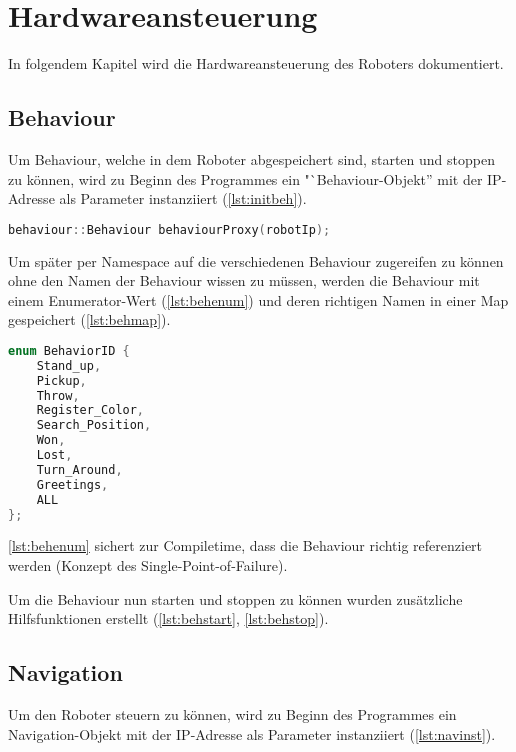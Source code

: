 \chapter{Hardwareansteuerung}

    In folgendem Kapitel wird die Hardwareansteuerung des Roboters dokumentiert.

    \section{Behaviour}

        Um Behaviour, welche in dem Roboter abgespeichert sind, starten und
        stoppen zu können, wird zu Beginn des Programmes ein
        "`Behaviour-Objekt'' mit der \ac{IP}-Adresse als Parameter instanziiert
        (\autoref{lst:initbeh}).

\begin{lstlisting}[language=c++,
                   caption={Initialisierung Behaviour},
                   label={lst:initbeh}]
behaviour::Behaviour behaviourProxy(robotIp);
\end{lstlisting}

        Um später per Namespace auf die verschiedenen Behaviour zugereifen zu
        können ohne den Namen der Behaviour wissen zu müssen, werden die
        Behaviour mit einem Enumerator-Wert (\autoref{lst:behenum}) und deren
        richtigen Namen in einer Map gespeichert (\autoref{lst:behmap}).

\begin{lstlisting}[language=c++,
                   caption={Behaviour Enumerator},
                   label={lst:behenum}]
enum BehaviorID {
    Stand_up,
    Pickup,
    Throw,
    Register_Color,
    Search_Position,
    Won,
    Lost,
    Turn_Around,
    Greetings,
    ALL
};
\end{lstlisting}

        \autoref{lst:behenum} sichert zur Compiletime, dass die Behaviour
        richtig referenziert werden (Konzept des Single-Point-of-Failure).

        Um die Behaviour nun starten und stoppen zu können wurden zusätzliche
        Hilfsfunktionen erstellt
        (\autoref{lst:behstart}, \autoref{lst:behstop}).

    \section{Navigation}

        Um den Roboter steuern zu können, wird zu Beginn des Programmes ein
        Navigation-Objekt mit der \ac{IP}-Adresse als Parameter instanziiert
        (\autoref{lst:navinst}).

